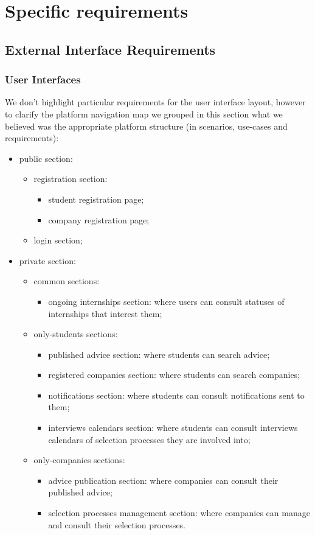 \chapter{Specific requirements}
	\section{External Interface Requirements}
		\subsection{User Interfaces}
			We don't highlight particular requirements for the user interface layout, however to clarify the platform navigation map we grouped in this section what we believed was the appropriate platform structure (in scenarios, use-cases and requirements):
			\begin{itemize}
				\item public section:
					\begin{itemize}
						\item registration section:
							\begin{itemize}
								\item student registration page;
								\item company registration page;
							\end{itemize}
						\item login section;
					\end{itemize}
				\item private section:
					\begin{itemize}
						\item common sections:
							\begin{itemize}
								\item ongoing internships section: where users can consult statuses of internships that interest them;
							\end{itemize}
						\item only-students sections:
							\begin{itemize}
								\item published advice section: where students can search advice;
								\item registered companies section: where students can search companies;
								\item notifications section: where students can consult notifications sent to them;
								\item interviews calendars section: where students can consult interviews calendars of selection processes they are involved into;
							\end{itemize}
						\item only-companies sections:
							\begin{itemize}
								\item advice publication section: where companies can consult their published advice;
								\item selection processes management section: where companies can manage and consult their selection processes.
							\end{itemize}
					\end{itemize}
			\end{itemize}
